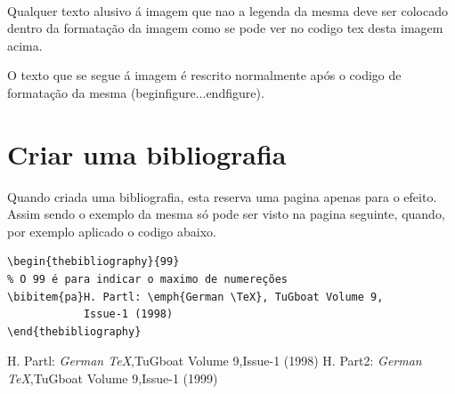 \documentclass[a4paper,11pt]{article}%
\begin{document}
\paragraph{}
Qualquer texto alusivo á imagem que nao a legenda da mesma deve ser colocado dentro da formatação da imagem como se pode ver no codigo tex desta imagem acima.

O texto que se segue á imagem é rescrito normalmente após o codigo de formatação da mesma (begin{figure}...end{figure}).


\newpage
\section{Criar uma bibliografia}
Quando criada uma bibliografia, esta reserva uma pagina apenas para o efeito. Assim sendo o exemplo da mesma só pode ser visto na pagina seguinte, quando, por exemplo aplicado o codigo abaixo.
\begin{verbatim}
\begin{thebibliography}{99} 
% O 99 é para indicar o maximo de numereções
\bibitem{pa}H. Partl: \emph{German \TeX}, TuGboat Volume 9,
			Issue-1 (1998)
\end{thebibliography}
\end{verbatim}

\begin{thebibliography}{99}
H. Partl: \emph{German \TeX},TuGboat Volume 9,Issue-1 (1998)
H. Part2: \emph{German \TeX},TuGboat Volume 9,Issue-1 (1999)

\end{thebibliography}
\end{document}
